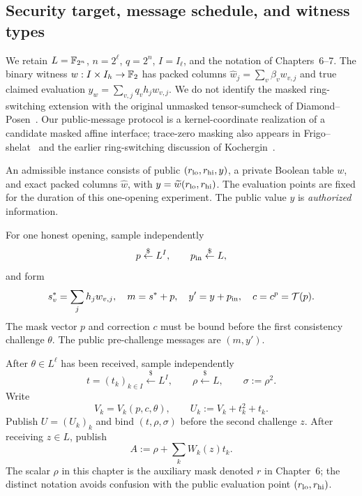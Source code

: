 \subsection{Security target, message schedule, and witness types}\label{sec:zkrs:model}
We retain $L=\mathbb{F}_{2^n}$, $n=2^\ell$, $q=2^n$, $I=I_\ell$, and the notation of Chapters~6--7.
The binary witness $w:I\times I_h\to\mathbb{F}_2$ has packed columns
$\widehat w_j=\sum_v\beta_vw_{v,j}$ and true claimed evaluation
$y_w=\sum_{v,j}q_vh_jw_{v,j}$.
We do not identify the masked ring-switching extension with the original
unmasked tensor-sumcheck of Diamond--Posen~\cite{DiamondPosen2024}.
Our public-message protocol is a kernel-coordinate realization
of a candidate masked affine interface; trace-zero masking also appears in
Frigo--shelat~\cite{FrigoShelat2026} and the earlier ring-switching
discussion of Kochergin~\cite{Kochergin2026}.

\begin{definition}\label{def:zkrs:instance}
An admissible instance consists of public $(r_{\rm lo},r_{\rm hi},y)$,
a private Boolean table $w$, and exact packed columns $\widehat w$,
with $y=\widetilde w(r_{\rm lo},r_{\rm hi})$.
The evaluation points are fixed for the duration of this one-opening
experiment. The public value $y$ is \emph{authorized} information.
\end{definition}

\begin{definition}\label{def:zkrs:prestate}
For one honest opening, sample independently
\[
 p\overset{\$}{\leftarrow}L^I,\qquad
 p_{\rm in}\overset{\$}{\leftarrow}L,
\]
and form
\[
 s_v^*=\sum_jh_jw_{v,j},\quad
 m=s^*+p,\quad y'=y+p_{\rm in},\quad c=c^p=\mathcal T(p).
\]
The mask vector $p$ and correction $c$ must be bound before the
first consistency challenge $\theta$.
The public pre-challenge messages are $(m,y')$.
\end{definition}

\begin{definition}\label{def:zkrs:poststate}
After $\theta\in L^\ell$ has been received, sample independently
\[
 t=(t_k)_{k\in I}\overset{\$}{\leftarrow}L^I,\qquad
 \rho\overset{\$}{\leftarrow}L,
 \qquad \sigma:=\rho^2.
\]
Write
\[
 V_k=V_k(p,c,\theta),\qquad
 U_k:=V_k+t_k^2+t_k.
\]
Publish $U=(U_k)_k$ and bind $(t,\rho,\sigma)$ before the second
challenge $z$. After receiving $z\in L$, publish
\[
 A:=\rho+\sum_kW_k(z)t_k.
\]
The scalar $\rho$ in this chapter is the auxiliary mask denoted $r$
in Chapter~6; the distinct notation avoids confusion with the
public evaluation point $(r_{\rm lo},r_{\rm hi})$.
\end{definition}

